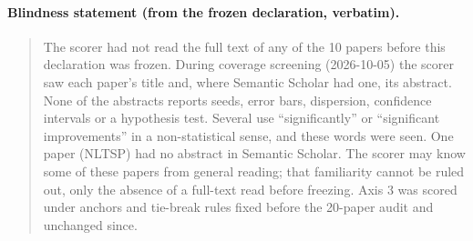 \documentclass{article}
\begin{document}
\paragraph{Blindness statement (from the frozen declaration, verbatim).}
\begin{quote}
\small
The scorer had not read the full text of any of the 10 papers before this declaration was frozen.
During coverage screening (2026-10-05) the scorer saw each paper's title and, where Semantic Scholar
had one, its abstract. None of the abstracts reports seeds, error bars, dispersion, confidence
intervals or a hypothesis test. Several use ``significantly'' or ``significant improvements'' in a
non-statistical sense, and these words were seen. One paper (NLTSP) had no abstract in Semantic
Scholar. The scorer may know some of these papers from general reading; that familiarity cannot be
ruled out, only the absence of a full-text read before freezing. Axis 3 was scored under anchors and
tie-break rules fixed before the 20-paper audit and unchanged since.
\end{quote}

\begin{table}[t]
\caption{Axis~3 check of the ten most-cited in-scope 2024--2026 papers in the coverage frame (Frame B).
``Cit.'' is the Semantic Scholar citation count at retrieval (2026-09-27). Evidence gives where the
headline comparison's numbers are reported; none states variance or a test.}
\label{tab:frameb}
\centering
\scriptsize

\end{table}




\end{document}
